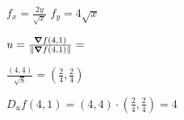 \documentclass[../practica_04.tex]{subfiles}
\begin{document}
    $ f_x = \frac{2y}{\sqrt{x}} $
    $ f_y = 4\sqrt{x} $

    $ u = \frac{\grad f (4,1)}{\norm*{\grad f (4,1)}} =  $

    $ \frac{(4,4)}{\sqrt{8}} = (\frac{2}{4}, \frac{2}{4}) $

    $ D_uf(4,1) = (4,4)\cdot (\frac{2}{4}, \frac{2}{4}) = 4 $
\end{document}
